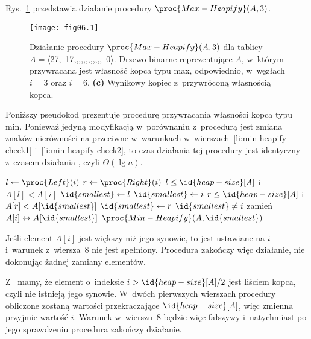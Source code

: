 
\exercise %
Rys.~\ref{fig:6.2-1} przedstawia działanie procedury $\proc{Max-Heapify}(A,3)$.
\begin{figure}[ht]
	\begin{center}
		\texttt{[image: fig06.1]}
	\end{center}
	\caption{Działanie procedury $\proc{Max-Heapify}(A,3)$ dla tablicy $A=\langle$27,\!~17,,,,,,,,,,,,\!~0$\rangle$. {\sffamily\bfseries{}} Drzewo binarne reprezentujące $A$, w~którym przywracana jest własność kopca typu max, odpowiednio, w~węzłach $i=3$ oraz $i=6$. {\sffamily\bfseries(c)} Wynikowy kopiec z~przywróconą własnością kopca.} \label{fig:6.2-1}
\end{figure}

\exercise %
Poniższy pseudokod prezentuje procedurę przywracania własności kopca typu min. Ponieważ jedyną modyfikacją w~porównaniu z~procedurą  jest zmiana znaków nierówności na przeciwne w~warunkach w~wierszach~\ref{li:min-heapify-check1} i~\ref{li:min-heapify-check2}, to czas działania tej procedury jest identyczny z~czasem działania , czyli $\Theta(\lg n)$.
\begin{codebox}
\li	$l\gets\proc{Left}(i)$
\li	$r\gets\proc{Right}(i)$
\li	\If $l\le\id{heap-size}[A]$ i~$A[l]<A[i]$ \label{li:min-heapify-check1}
\li		\Then $\id{smallest}\gets l$
\li		\Else $\id{smallest}\gets i$
		\End
\li	\If $r\le\id{heap-size}[A]$ i~$A[r]<A[\id{smallest}]$ \label{li:min-heapify-check2}
\li		\Then $\id{smallest}\gets r$
		\End
\li	\If $\id{smallest}\ne i$
\li		\Then
			zamień $A[i]\leftrightarrow A[\id{smallest}]$
\li			$\proc{Min-Heapify}(A,\id{smallest})$
		\End
\end{codebox}

\exercise %
Jeśli element $A[i]$ jest większy niż jego synowie, to  jest ustawiane na $i$ i~warunek z~wiersza~8 nie jest spełniony. Procedura zakończy więc działanie, nie dokonując żadnej zamiany elementów.

\exercise %
Z~ mamy, że element o~indeksie $i>\id{heap-size}[A]/2$ jest liściem kopca, czyli nie istnieją jego synowie. W~dwóch pierwszych wierszach procedury  obliczone zostaną wartości przekraczające $\id{heap-size}[A]$, więc zmienna  przyjmie wartość $i$. Warunek w~wierszu~8 będzie więc fałszywy i~natychmiast po jego sprawdzeniu procedura zakończy działanie.

